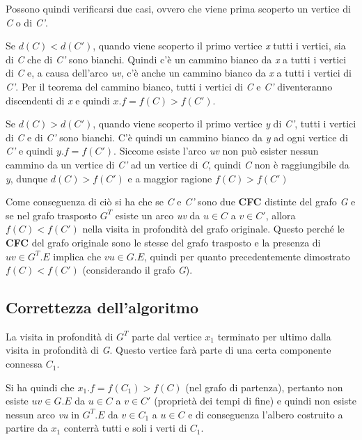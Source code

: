 Possono quindi verificarsi due casi, ovvero che viene prima scoperto un
vertice di \emph{C} o di \emph{C'}.

Se $d(C) < d(C')$, quando viene scoperto il primo vertice
\emph{x} tutti i vertici, sia di \emph{C} che di \emph{C'} sono bianchi.
Quindi c'è un cammino bianco da \emph{x} a tutti i vertici di \emph{C}
e, a causa dell'arco \emph{uv}, c'è anche un cammino bianco da \emph{x}
a tutti i vertici di \emph{C'}. Per il teorema del cammino bianco, tutti
i vertici di \emph{C} e \emph{C'} diventeranno discendenti di \emph{x} e
quindi $x.f = f(C) > f(C')$.

Se $ d(C) > d(C') $, quando viene scoperto il primo vertice \textit{y} di \textit{C'}, tutti i vertici di \textit{C} e di \textit{C'} sono bianchi.
C'è quindi un cammino bianco da \textit{y} ad ogni vertice di \textit{C'} e quindi $ y.f = f(C') $.
Siccome esiste l'arco \textit{uv} non può esister nessun cammino da un vertice di \textit{C'} ad un vertice di \textit{C}, quindi \textit{C} non è raggiungibile da \textit{y}, dunque $ d(C) > f(C') $ e a maggior ragione $ f(C) > f(C') $

Come conseguenza di ciò si ha che se \textit{C} e \textit{C'} sono due \textbf{CFC} distinte del grafo \textit{G} e se nel grafo trasposto $ G^T $ esiste un arco \textit{uv} da $ u \in C$ a $ v \in C' $, allora $ f(C) < f(C') $ nella visita in profondità del grafo originale.
Questo perché le \textbf{CFC} del grafo originale sono le stesse del grafo trasposto e la presenza di $ uv \in G^T.E $ implica che $ vu \in G.E$, quindi per quanto precedentemente dimostrato $ f(C) < f(C') $ (considerando il grafo \textit{G}).

\subsection{Correttezza dell'algoritmo}\label{correttezza-dellalgoritmo}

La visita in profondità di $G^T$ parte dal vertice $x_1$
terminato per ultimo dalla visita in profondità di \emph{G}. Questo
vertice farà parte di una certa componente connessa $C_1$.

Si ha quindi che $x_1.f = f(C_1) > f(C)$ (nel grafo di partenza), pertanto non esiste $uv \in G.E$ da $ u \in C $ a $ v \in C' $ (proprietà dei tempi di fine) e quindi non esiste
nessun arco \emph{vu} in $G^T.E$ da $v \in C_1$ a $u \in C$ e di conseguenza l'albero costruito a partire da $x_1$ conterrà tutti e
soli i verti di $C_1$.


